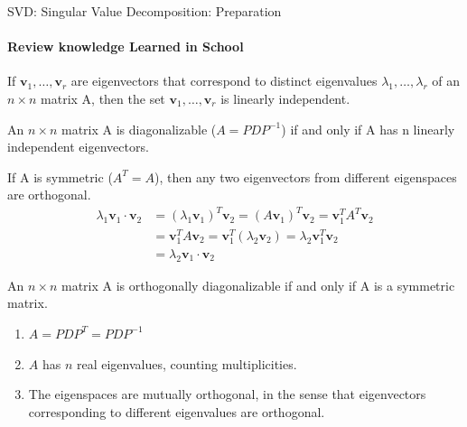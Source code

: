 \documentclass{beamer}
\begin{document}
\begin{frame}{SVD: Singular Value Decomposition: Preparation}
  \framesubtitle{Review knowledge Learned in School}
  {\tiny
  \begin{block}{}
    If $\textbf{v}_1,\dots,\textbf{v}_r$ are eigenvectors that correspond to distinct eigenvalues $\lambda_1,\dots,\lambda_r$ of an $n{\times}n$ matrix A, then the set ${\textbf{v}_1,\dots,\textbf{v}_r}$ is linearly independent.
  \end{block}
  \begin{block}{}
    An $n{\times}n$ matrix A is diagonalizable ($A=PDP^{-1}$) if and only if A has n linearly independent eigenvectors.
  \end{block}
  \begin{block}{}
    If A is symmetric ($A^T=A$), then any two eigenvectors from different eigenspaces are orthogonal.
    \begin{align*}
      \lambda_1 \textbf{v}_1 \cdot \textbf{v}_2 &= (\lambda_1 \textbf{v}_1)^T \textbf{v}_2 = (A \textbf{v}_1)^T \textbf{v}_2 = \textbf{v}_1^T A^T \textbf{v}_2 \\
                                                &= \textbf{v}_1^T A \textbf{v}_2 = \textbf{v}_1^T (\lambda_2 \textbf{v}_2) = \lambda_2 \textbf{v}_1^T \textbf{v}_2 \\
                                                &= \lambda_2 \textbf{v}_1 \cdot \textbf{v}_2
    \end{align*}
  \end{block}
  \begin{block}{}
    An $n{\times}n$ matrix A is orthogonally diagonalizable if and only if A is a symmetric matrix.
    \begin{enumerate}[I]
      \item $A = PDP^T = PDP^{-1}$
      \item $A$ has $n$ real eigenvalues, counting multiplicities.
      \item The eigenspaces are mutually orthogonal, in the sense that eigenvectors corresponding to different eigenvalues are orthogonal.
    \end{enumerate}
  \end{block}
  }%
\end{frame}
\end{document}
